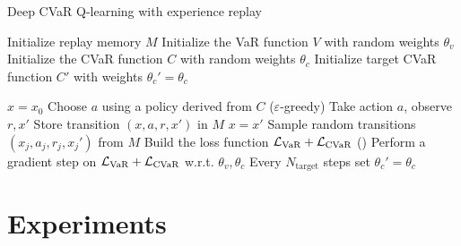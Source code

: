 \begin{algorithm}
\caption{Deep CVaR Q-learning with experience replay}
\begin{algorithmic}\label{alg:cvardqn}

    \STATE Initialize replay memory $M$
    \STATE Initialize the VaR function $V$ with random weights $\theta_v$
    \STATE Initialize the CVaR function $C$ with random weights $\theta_c$
    \STATE Initialize target CVaR function $C'$ with weights $\theta_c'=\theta_c$

    \STATE $x=x_0$
	\STATE Choose $a$ using a policy derived from $C$ ($\varepsilon$-greedy)
	\STATE Take action $a$, observe $r, x'$
	\STATE Store transition $(x, a, r, x')$ in $M$
	\STATE $x = x'$
	\STATE Sample random transitions $(x_j, a_j, r_j, x_j')$ from $M$
	\STATE Build the loss function $\mathcal{L}_{\text{VaR}} + \mathcal{L}_{\text{CVaR}}$ ()
    \STATE Perform a gradient step on $\mathcal{L}_{\text{VaR}} + \mathcal{L}_{\text{CVaR}}$ w.r.t. $\theta_v, \theta_c$
    \STATE Every $N_\text{target}$ steps set $\theta_c'=\theta_c$
	\ENDWHILE
	\ENDFOR
	
\end{algorithmic}
\end{algorithm}



\section{Experiments}

